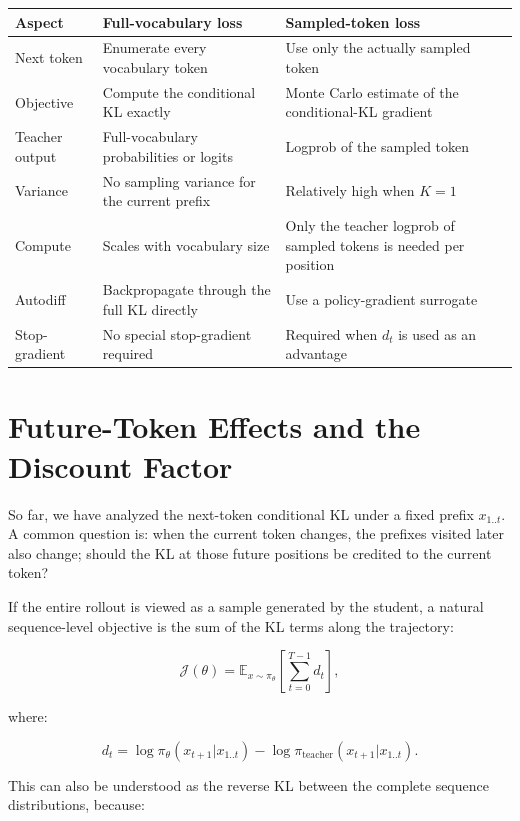 \documentclass[11pt,a4paper]{article}
\begin{document}
\begin{longtable}{>{\raggedright\arraybackslash}p{}
                  >{\raggedright\arraybackslash}p{}
                  >{\raggedright\arraybackslash}p{}}
\toprule
Aspect & Full-vocabulary loss & Sampled-token loss \\
\midrule
Next token & Enumerate every vocabulary token & Use only the actually sampled token \\
Objective & Compute the conditional KL exactly & Monte Carlo estimate of the conditional-KL gradient \\
Teacher output & Full-vocabulary probabilities or logits & Logprob of the sampled token \\
Variance & No sampling variance for the current prefix & Relatively high when $K=1$ \\
Compute & Scales with vocabulary size & Only the teacher logprob of sampled tokens is needed per position \\
Autodiff & Backpropagate through the full KL directly & Use a policy-gradient surrogate \\
Stop-gradient & No special stop-gradient required & Required when $d_t$ is used as an advantage \\
\bottomrule
\end{longtable}

\section{Future-Token Effects and the Discount Factor}

So far, we have analyzed the next-token conditional KL under a fixed prefix $x_{1..t}$. A common question is: when the current token changes, the prefixes visited later also change; should the KL at those future positions be credited to the current token?

If the entire rollout is viewed as a sample generated by the student, a natural sequence-level objective is the sum of the KL terms along the trajectory:

\[
\mathcal J(\theta)
=
\mathbb E_{x\sim\pi_\theta}
\left[\sum_{t=0}^{T-1}d_t\right],
\]

where:

\[
d_t
=
\log\pi_\theta(x_{t+1}|x_{1..t})
-
\log\pi_{\text{teacher}}(x_{t+1}|x_{1..t}).
\]

This can also be understood as the reverse KL between the complete sequence distributions, because:
\end{document}
